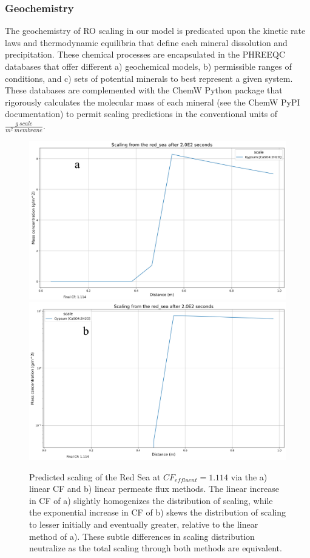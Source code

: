 \subsubsection{Geochemistry}
The geochemistry of RO scaling in our model is predicated upon the kinetic rate laws and thermodynamic equilibria that define each mineral dissolution and precipitation. These chemical processes are encapsulated in the PHREEQC databases that offer different a) geochemical models, b) permissible ranges of conditions, and c) sets of potential minerals to best represent a given system. These databases are complemented with the ChemW Python package that rigorously calculates the molecular mass of each mineral (see the ChemW PyPI documentation) to permit scaling predictions in the conventional units of $\frac{g~scale}{m^2~membrane}$.

\begin{figure}
    \centering
    \includegraphics[width=0.9\linewidth]{images/ROSSpy/sensitivity_analyses/permeate_approach/linear_cf.png} \\ \midrule
    \includegraphics[width=0.9\linewidth]{images/ROSSpy/sensitivity_analyses/permeate_approach/linear_permeate.png} 
    \caption{
        Predicted scaling of the Red Sea at $CF_{effluent}=1.114$ via the a) linear CF and b) linear permeate flux methods. The linear increase in CF of a) slightly homogenizes the distribution of scaling, while the exponential increase in CF of b) skews the distribution of scaling to lesser initially and eventually greater, relative to the linear method of a). These subtle differences in scaling distribution neutralize as the total scaling through both methods are equivalent. 
    }
    \label{permeate_approach}
\end{figure}


